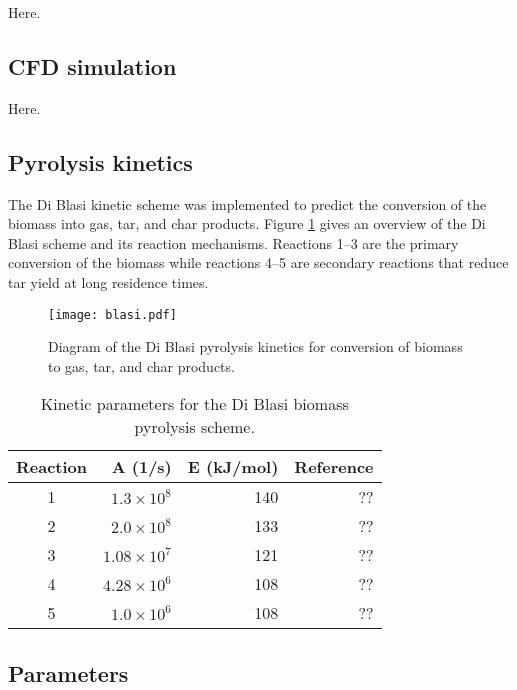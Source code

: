 Here.

\subsection{CFD simulation}

Here.

\subsection{Pyrolysis kinetics}

The Di Blasi kinetic scheme was implemented to predict the conversion of the biomass into gas, tar, and char products. Figure \ref{fig:blasi} gives an overview of the Di Blasi scheme and its reaction mechanisms. Reactions 1--3 are the primary conversion of the biomass while reactions 4--5 are secondary reactions that reduce tar yield at long residence times.

\begin{figure}[H]
    \centering
    \texttt{[image: blasi.pdf]}
    \caption{Diagram of the Di Blasi pyrolysis kinetics for conversion of biomass to gas, tar, and char products.}
    \label{fig:blasi}
\end{figure}

\begin{table}[H]
    \centering
    \caption{Kinetic parameters for the Di Blasi biomass pyrolysis scheme.}
    \begin{tabular}{crrr}
        \hline
        Reaction    & A (1/s)               & E (kJ/mol)    & Reference     \\
        \hline
        1           & $1.3 \times 10^8$     & 140           & ??            \\
        2           & $2.0 \times 10^8$     & 133           & ??            \\
        3           & $1.08 \times 10^7$    & 121           & ??            \\
        4           & $4.28 \times 10^6$    & 108           & ??            \\
        5           & $1.0 \times 10^6$     & 108           & ??            \\
        \hline
    \end{tabular}
\end{table}

\subsection{Parameters}

